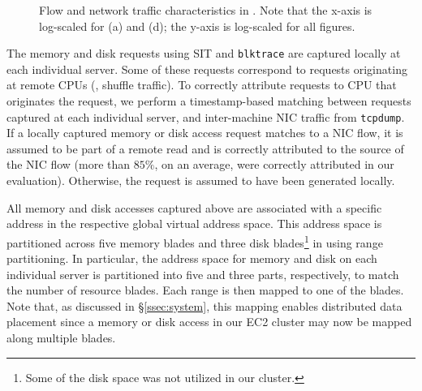 \begin{figure}
{	\label{fig:tv}
  }  
  \caption{\small{Flow and network traffic characteristics in \dis. Note that the x-axis is log-scaled for (a) and (d); the y-axis is log-scaled for all figures. }}
  \label{fig:traffic}
\end{figure}
%

The memory and disk requests using SIT and {\tt blktrace} are captured locally at each individual server. Some of these requests correspond to requests originating at remote CPUs (\eg, shuffle traffic). To correctly attribute requests to CPU that originates the request, we perform a timestamp-based matching between requests captured at each individual server, and inter-machine NIC traffic from {\tt tcpdump}. If a locally captured memory or disk access request matches to a NIC flow, it is assumed to be part of a remote read and is correctly attributed to the source of the NIC flow (more than $85\%$, on an average, were correctly attributed in our evaluation). Otherwise, the request is assumed to have been generated locally. 

All memory and disk accesses captured above are associated with a specific address in the respective global virtual address space. This address space is partitioned across five memory blades and three disk blades{\footnote{Some of the disk space was not utilized in our cluster.}} in \dis using range partitioning. 
In particular, the address space for memory and disk on each individual server is partitioned into five and three parts, respectively, to match the number of resource blades. Each range is then mapped to one of the blades. Note that, as discussed in \S\ref{ssec:system}, this mapping enables distributed data placement since a memory or disk access in our EC2 cluster may now be mapped along multiple blades.


